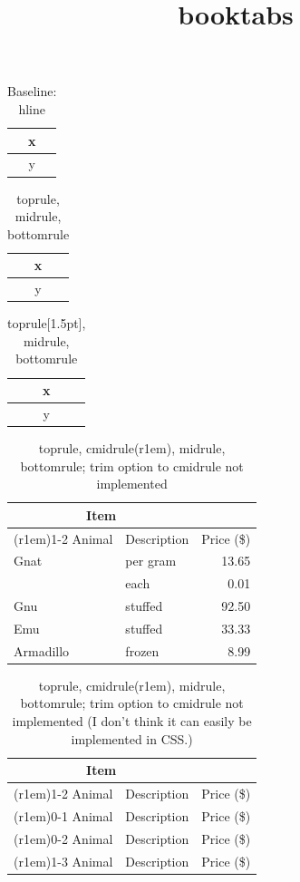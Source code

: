 \documentclass{amsart}
\title{booktabs}
\begin{document}
\maketitle

\begin{table}[h]
\caption{Baseline: hline}
\begin{tabular}{c}
\hline
x\\
\hline
y\\
\hline
\end{tabular}
\end{table}

\begin{table}[h]
\caption{toprule, midrule, bottomrule}
\begin{tabular}{c}
\toprule
x\\
\midrule
y\\
\bottomrule
\end{tabular}
\end{table}

\begin{table}[h]
\caption{toprule[1.5pt], midrule, bottomrule}
\begin{tabular}{c}
\toprule[1.5pt]
x\\
\midrule
y\\
\bottomrule
\end{tabular}
\end{table}

\begin{table}[h]
\caption{toprule, cmidrule(r{1em}), midrule, bottomrule; trim option to
  cmidrule not implemented}
\begin{tabular}{@{}llr@{}}
\toprule
\multicolumn{2}{c}{Item} \\
\cmidrule(r{1em}){1-2}
Animal & Description & Price (\$)\\
\midrule
Gnat & per gram & 13.65 \\
& each
 & 0.01 \\
Gnu
 & stuffed
 & 92.50 \\
Emu
 & stuffed
 & 33.33 \\
Armadillo & frozen & 8.99 \\
\bottomrule
\end{tabular}
\end{table}

\begin{table}[h]
\caption{toprule, cmidrule(r{1em}), midrule, bottomrule; trim option to
  cmidrule not implemented (I don't think it can easily be implemented
in CSS.)}
\begin{tabular}{@{}llr@{}}
\toprule
\multicolumn{2}{c}{Item} \\
\cmidrule(r{1em}){1-2}
Animal & Description & Price (\$)\\
\cmidrule(r{1em}){0-1}
Animal & Description & Price (\$)\\
\cmidrule(r{1em}){0-2}
Animal & Description & Price (\$)\\
\cmidrule(r{1em}){1-3}
Animal & Description & Price (\$)\\
\end{tabular}
\end{table}
\end{document}
